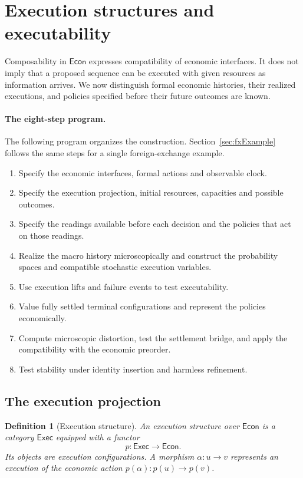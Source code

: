\documentclass[11pt,a4paper]{article}
\newtheorem{definition}{Definition}[section]
\newcommand{\Econ}{\mathsf{Econ}}
\begin{document}
\section{Execution structures and executability}
\label{sec:executability}

Composability in $\Econ$ expresses compatibility of economic interfaces.
It does not imply that a proposed sequence can be executed with given
resources as information arrives. We now distinguish formal economic
histories, their realized executions, and policies specified before their
future outcomes are known. 


\paragraph{The eight-step program.}
The following program organizes the construction. Section~\ref{sec:fxExample}
follows the same steps for a single foreign-exchange example.
\begin{enumerate}[label=\textnormal{\arabic*.},leftmargin=9mm]
\item Specify the economic interfaces, formal actions and observable clock.
\item Specify the execution projection, initial resources, capacities and
      possible outcomes.
\item Specify the readings available before each decision and the policies
      that act on those readings.
\item Realize the macro history microscopically and construct the
      probability spaces and compatible stochastic execution variables.
\item Use execution lifts and failure events to test executability.
\item Value fully settled terminal configurations and represent the
      policies economically.
\item Compute microscopic distortion, test the settlement bridge, and
      apply the compatibility with the economic preorder.
\item Test stability under identity insertion and harmless refinement.
\end{enumerate}

\subsection{The execution projection}
\label{subsec:execution-projection}

\begin{definition}[Execution structure]
An \emph{execution structure} over $\Econ$ is a category $\mathsf{Exec}$
equipped with a functor
\[
    p:\mathsf{Exec}\longrightarrow\Econ.
\]
Its objects are \emph{execution configurations}. A morphism
$\alpha:u\to v$ represents an execution of the economic action
$p(\alpha):p(u)\to p(v)$.
\end{definition}
\end{document}
